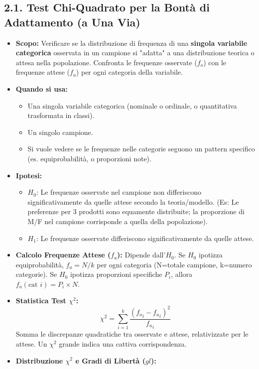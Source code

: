 \documentclass[12pt, a4paper]{article}
\newcommand{\chisq}{\chi^2} %
\newcommand{\Hnull}{H_0} %
\newcommand{\Halt}{H_1} %
\newcommand{\df}{gl} %
\newcommand{\fo}{f_o} %
\newcommand{\fa}{f_a} %
\begin{document}
\subsection*{2.1. Test Chi-Quadrato per la Bontà di Adattamento (a Una Via)}
\begin{itemize}
    \item \textbf{Scopo:} Verificare se la distribuzione di frequenza di una \textbf{singola variabile categorica} osservata in un campione si "adatta" a una distribuzione teorica o attesa nella popolazione. Confronta le frequenze osservate ($\fo$) con le frequenze attese ($\fa$) per ogni categoria della variabile.
    \item \textbf{Quando si usa:}
        \begin{itemize}
            \item Una singola variabile categorica (nominale o ordinale, o quantitativa trasformata in classi).
            \item Un singolo campione.
            \item Si vuole vedere se le frequenze nelle categorie seguono un pattern specifico (es. equiprobabilità, o proporzioni note).
        \end{itemize}
    \item \textbf{Ipotesi:}
        \begin{itemize}
            \item $\Hnull$: Le frequenze osservate nel campione non differiscono significativamente da quelle attese secondo la teoria/modello. (Es: Le preferenze per 3 prodotti sono equamente distribuite; la proporzione di M/F nel campione corrisponde a quella della popolazione).
            \item $\Halt$: Le frequenze osservate differiscono significativamente da quelle attese.
        \end{itemize}
    \item \textbf{Calcolo Frequenze Attese ($\fa$):} Dipende dall'$\Hnull$. Se $\Hnull$ ipotizza equiprobabilità, $\fa = N / k$ per ogni categoria (N=totale campione, k=numero categorie). Se $\Hnull$ ipotizza proporzioni specifiche $P_i$, allora $\fa (\text{cat } i) = P_i \times N$.
    \item \textbf{Statistica Test $\chisq$:}
        $$ \chisq = \sum_{i=1}^{k} \frac{({\fo}_i - {\fa}_i)^2}{{\fa}_i} $$
        Somma le discrepanze quadratiche tra osservate e attese, relativizzate per le attese. Un $\chisq$ grande indica una cattiva corrispondenza.
    \item \textbf{Distribuzione $\chisq$ e Gradi di Libertà ($\df$):}

\end{itemize}
\end{document}
